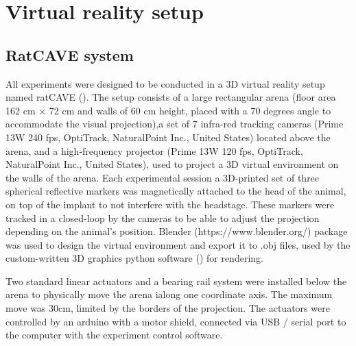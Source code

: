 \section{Virtual reality setup}
\label{sec:vr_setup}

\subsection{RatCAVE system}

All experiments were designed to be conducted in a 3D virtual reality setup named ratCAVE (\cite{DelGrosso2018}). The setup consists of a large rectangular arena (floor area 162 cm × 72 cm and walls of 60 cm height, placed with a 70 degrees angle to accommodate the visual projection),a set of 7 infra-red tracking cameras (Prime 13W 240 fps, OptiTrack, NaturalPoint Inc., United States) located above the arena, and a high-frequency projector (Prime 13W 120 fps, OptiTrack, NaturalPoint Inc., United States), used to project a 3D virtual environment on the walls of the arena. Each experimental session a 3D-printed set of three spherical reflective markers was magnetically attached to the head of the animal, on top of the implant to not interfere with the headstage. These markers were tracked in a closed-loop by the cameras  to be able to adjust the projection depending on the animal's position. Blender (https://www.blender.org/) package was used to design the virtual environment and export it to .obj files, used by the custom-written 3D graphics python software (\cite{Grosso2019}) for rendering.

Two standard linear actuators and a bearing rail system were installed below the arena to physically move the arena ialong one coordinate axis. The maximum move was 30cm, limited by the borders of the projection. The actuators were controlled by an arduino with a motor shield, connected via USB / serial port to the computer with the experiment control software.

